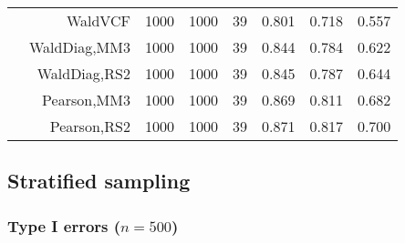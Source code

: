 \documentclass[
]{article}
\begin{document}
\begin{table}[H]
{\begin{tabular}[t]{lrrrrrrr}
\hspace{1em} & WaldVCF & 1000 & 1000 & 39 & 0.801 & 0.718 & 0.557\\

\hspace{1em} & WaldDiag,MM3 & 1000 & 1000 & 39 & 0.844 & 0.784 & 0.622\\

\hspace{1em} & WaldDiag,RS2 & 1000 & 1000 & 39 & 0.845 & 0.787 & 0.644\\

\hspace{1em} & Pearson,MM3 & 1000 & 1000 & 39 & 0.869 & 0.811 & 0.682\\

\hspace{1em} & Pearson,RS2 & 1000 & 1000 & 39 & 0.871 & 0.817 & 0.700\\
\bottomrule
\end{tabular}}
\endgroup{}
\end{table}

\hypertarget{stratified-sampling}{%
\subsection{Stratified sampling}\label{stratified-sampling}}

\hypertarget{type-i-errors-n500-1}{%
\subsubsection{\texorpdfstring{Type I errors
(\(n=500\))}{Type I errors (n=500)}}\label{type-i-errors-n500-1}}
\end{document}
